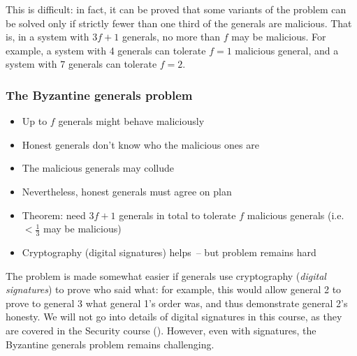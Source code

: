 This is difficult: in fact, it can be proved that some variants of the problem can be solved only if strictly fewer than one third of the generals are malicious.
That is, in a system with $3f+1$ generals, no more than $f$ may be malicious.
For example, a system with 4 generals can tolerate $f=1$ malicious general, and a system with 7 generals can tolerate $f=2$.

\begin{frame}
    \label{s:byzantine-discussion}
    \frametitle{The Byzantine generals problem}
    \begin{itemize}
        \item Up to $f$ generals might behave maliciously\\[0.5em]
        \item Honest generals don't know who the malicious ones are\\[0.5em]
        \item The malicious generals may collude\\[0.5em]
        \item Nevertheless, honest generals must agree on plan\\[2em]\pause
        \item Theorem: need $3f+1$ generals in total to tolerate $f$ malicious generals (i.e.\ $< \frac{1}{3}$ may be malicious)\\[0.5em]
        \item Cryptography (digital signatures) helps~-- but problem remains hard\\[0.5em]
    \end{itemize}
\end{frame}

The problem is made somewhat easier if generals use cryptography (\emph{digital signatures}) to prove who said what: for example, this would allow general 2 to prove to general 3 what general 1's order was, and thus demonstrate general 2's honesty.
We will not go into details of digital signatures in this course, as they are covered in the Security course (\whenissecurity).
However, even with signatures, the Byzantine generals problem remains challenging.

